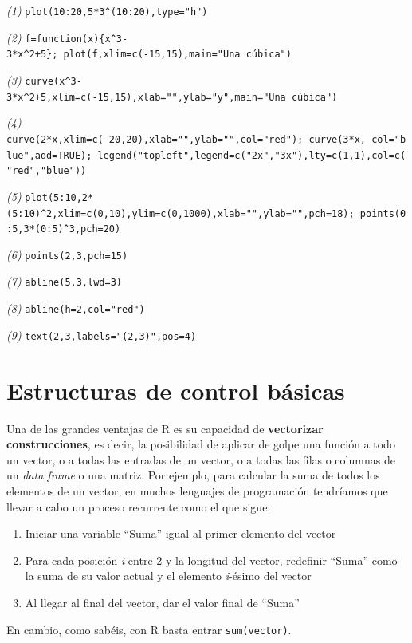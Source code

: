 \documentclass[
]{book}
\providecommand{\tightlist}{%
  \setlength{\itemsep}{0pt}\setlength{\parskip}{0pt}}
\theoremstyle{definition}
\theoremstyle{definition}
\theoremstyle{definition}
\theoremstyle{remark}
\begin{document}
\emph{(1)} \texttt{plot(10:20,5*3\^{}(10:20),type="h")}

\emph{(2)} \texttt{f=function(x)\{x\^{}3-3*x\^{}2+5\};\ plot(f,xlim=c(-15,15),main="Una\ cúbica")}

\emph{(3)} \texttt{curve(x\^{}3-3*x\^{}2+5,xlim=c(-15,15),xlab="",ylab="y",main="Una\ cúbica")}

\emph{(4)} \texttt{curve(2*x,xlim=c(-20,20),xlab="",ylab="",col="red");\ curve(3*x,\ col="blue",add=TRUE);\ legend("topleft",legend=c("2x","3x"),lty=c(1,1),col=c("red","blue"))}

\emph{(5)} \texttt{plot(5:10,2*(5:10)\^{}2,xlim=c(0,10),ylim=c(0,1000),xlab="",ylab="",pch=18);\ points(0:5,3*(0:5)\^{}3,pch=20)}

\emph{(6)} \texttt{points(2,3,pch=15)}

\emph{(7)} \texttt{abline(5,3,lwd=3)}

\emph{(8)} \texttt{abline(h=2,col="red")}

\emph{(9)} \texttt{text(2,3,labels="(2,3)",pos=4)}

\hypertarget{chap:for}{%
\chapter{Estructuras de control básicas}\label{chap:for}}

Una de las grandes ventajas de R es su capacidad de \textbf{vectorizar construcciones}, es decir, la posibilidad de aplicar de golpe una función a todo un vector, o a todas las entradas de un vector, o a todas las filas o columnas de un \emph{data frame} o una matriz. Por ejemplo, para calcular la suma de todos los elementos de un vector, en muchos lenguajes de programación tendríamos que llevar a cabo un proceso recurrente como el que sigue:

\begin{enumerate}
\def\labelenumi{\arabic{enumi}.}
\tightlist
\item
  Iniciar una variable ``Suma'' igual al primer elemento del vector
\item
  Para cada posición \emph{i} entre 2 y la longitud del vector, redefinir ``Suma'' como la suma de su valor actual y el elemento \emph{i}-ésimo del vector
\item
  Al llegar al final del vector, dar el valor final de ``Suma''
\end{enumerate}

En cambio, como sabéis, con R basta entrar \texttt{sum(vector)}.
\end{document}
